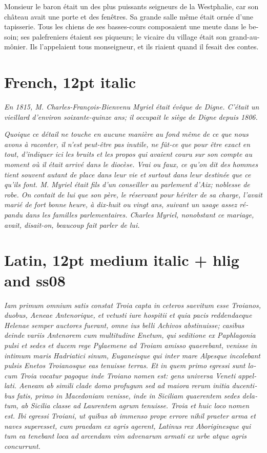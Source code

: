 \documentclass[12pt]{book}
\newcommand{\frit}[1]{\textfrench{\itshape #1}}
\newcommand{\latn}[1]{\textlatin{\itshape\addfontfeatures{Ligatures=Historic,
    Weight=500,StylisticSet=8}#1}}
\begin{document}
\textfrench{Monsieur le baron était un des plus puissants seigneurs de la
Westphalie, car son château avait une porte et des fenêtres. Sa grande
salle même était ornée d’une tapisserie. Tous les chiens de ses
basses-cours composaient une meute dans le besoin; ses palefreniers
étaient ses piqueurs; le vicaire du village était son
grand-aumônier. Ils l’appelaient tous monseigneur, et ils riaient
quand il fesait des contes.}

\section*{French, 12pt italic}

\frit{En 1815, M. Charles-François-Bienvenu Myriel était évêque de
Digne. C'était un vieillard d'environ soixante-quinze ans; il occupait
le siège de Digne depuis 1806.}

\frit{Quoique ce détail ne touche en aucune manière au fond même de ce que
nous avons à raconter, il n'est peut-être pas inutile, ne fût-ce que
pour être exact en tout, d'indiquer ici les bruits et les propos qui
avaient couru sur son compte au moment où il était arrivé dans le
diocèse. Vrai ou faux, ce qu'on dit des hommes tient souvent autant de
place dans leur vie et surtout dans leur destinée que ce qu'ils
font. M. Myriel était fils d'un conseiller au parlement d'Aix;
noblesse de robe. On contait de lui que son père, le réservant pour
hériter de sa charge, l'avait marié de fort bonne heure, à dix-huit ou
vingt ans, suivant un usage assez répandu dans les familles
parlementaires. Charles Myriel, nonobstant ce mariage, avait,
disait-on, beaucoup fait parler de lui.}

\section*{Latin, 12pt medium italic + hlig and ss08}

\latn{Iam primum omnium satis constat Troia capta in ceteros saevitum esse
Troianos, duobus, Aeneae Antenorique, et vetusti iure hospitii et quia
pacis reddendaeque Helenae semper auctores fuerant, omne ius belli
Achivos abstinuisse; casibus deinde variis Antenorem cum multitudine
Enetum, qui seditione ex Paphlagonia pulsi et sedes et ducem rege
Pylaemene ad Troiam amisso quaerebant, venisse in intimum maris
Hadriatici sinum, Euganeisque qui inter mare Alpesque incolebant
pulsis Enetos Troianosque eas tenuisse terras. Et in quem primo
egressi sunt locum Troia vocatur pagoque inde Troiano nomen est: gens
universa Veneti appellati. Aeneam ab simili clade domo profugum sed ad
maiora rerum initia ducentibus fatis, primo in Macedoniam venisse,
inde in Siciliam quaerentem sedes delatum, ab Sicilia classe ad
Laurentem agrum tenuisse. Troia et huic loco nomen est. Ibi egressi
Troiani, ut quibus ab immenso prope errore nihil praeter arma et naves
superesset, cum praedam ex agris agerent, Latinus rex Aboriginesque
qui tum ea tenebant loca ad arcendam vim advenarum armati ex urbe
atque agris concurrunt.}
\end{document}
